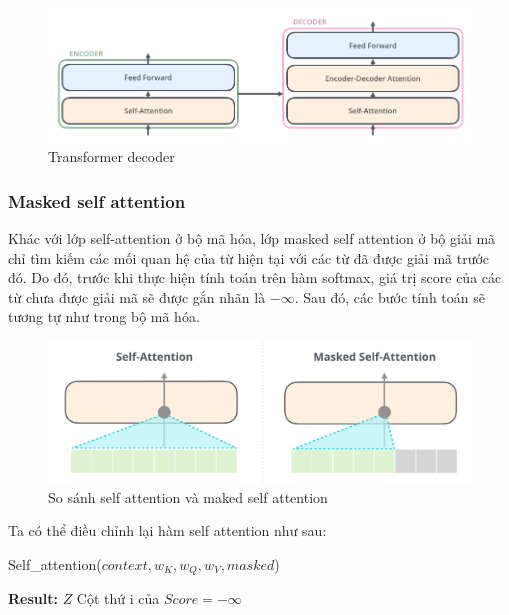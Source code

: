 \begin{figure}[H]
    \begin{center}
        \includegraphics[scale=0.5]{images/Transformer_decoder}
        \caption{Transformer decoder}
        \label{fig:decoder}
    \end{center}
\end{figure}

\subsubsection{Masked self attention}

Khác với lớp self-attention ở bộ mã hóa, lớp masked self attention ở bộ giải mã chỉ tìm kiếm các mối quan hệ của từ hiện tại với các từ đã được giải mã trước đó. Do đó, trước khi thực hiện tính toán trên hàm softmax, giá trị score của các từ chưa được giải mã sẽ được gắn nhãn là $-\infty$. Sau đó, các bước tính toán sẽ tương tự như trong bộ mã hóa.

\begin{figure}[H]
    \begin{center}
        \includegraphics[scale=0.3]{images/self-attention-and-masked-self-attention}
        \caption{So sánh self attention và maked self attention}
        \label{fig:masked-self-attention}
    \end{center}
\end{figure}

Ta có thể điều chỉnh lại hàm self attention như sau:

\begin{algorithm}[H]
    \caption{Self\_attention($context, w_K, w_Q, w_V, masked$)}
    \begin{algorithmic}[1]
		\State \textbf{Result:} $Z$
			\State Cột thứ i của $Score = -\infty$
		\EndFor
    \end{algorithmic}
\end{algorithm}


